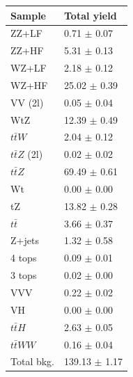 \begin{table}[!h]
	\centering
	\small
	\begin{tabular}{|l|l|}
		\hline
		\textbf{Sample}                  			 & \textbf{Total yield}     \\
		\hline
		ZZ+LF                 & 0.71 $\pm$ 0.07          \\   
		ZZ+HF                 & 5.31 $\pm$ 0.13         \\   
		WZ+LF                  & 2.18 $\pm$ 0.12         \\   
		WZ+HF                  & 25.02 $\pm$ 0.39         \\   
		VV (2l)                 					  & 0.05 $\pm$ 0.04                             \\   
		WtZ                       					  & 12.39 $\pm$ 0.49                                \\   
		$t\bar{t}W$             					  & 2.04 $\pm$ 0.12                             \\   
		$t\bar{t}Z$ (2l)       					      & 0.02 $\pm$ 0.02                             \\   
	    $t\bar{t}Z$           &69.49 $\pm$ 0.61   \\   
		Wt                      					  & 0.00 $\pm$ 0.00                           \\   
		tZ                      					  & 13.82 $\pm$ 0.28                            \\     
		$t\bar{t}$             						  & 3.66 $\pm$ 0.37                            \\   
		Z+jets                 						  & 1.32 $\pm$ 0.58                            \\   
		4 tops                 						  & 0.09 $\pm$ 0.01                           \\   
		3 tops                 						  & 0.02 $\pm$ 0.00                           \\   
		VVV                     					  & 0.22 $\pm$ 0.02                           \\   
		VH                      					  & 0.00 $\pm$ 0.00                           \\   
		$t\bar{t}H$             					  & 2.63 $\pm$ 0.05                           \\   
		$t\bar{t}WW$          					      & 0.16 $\pm$ 0.04                           \\   
		\hline                                                                    
		Total bkg.              					  &  139.13 $\pm$ 1.17                          \\       

\end{tabular}
\end{table}
